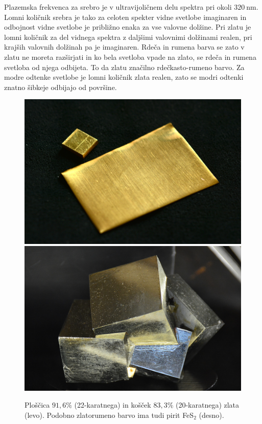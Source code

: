 Plazemska frekvenca za srebro je v ultravijoličnem delu spektra 
pri okoli $320~\si{\nano\meter}$. Lomni količnik srebra je tako za celoten 
spekter vidne svetlobe imaginaren in odbojnost
vidne svetlobe je približno enaka za vse valovne dolžine.  
Pri zlatu je lomni 
količnik za del vidnega spektra z daljšimi valovnimi dolžinami realen, pri 
krajših valovnih dolžinah pa je imaginaren. Rdeča in rumena barva se zato v zlatu 
ne moreta razširjati in ko bela svetloba vpade na zlato, se rdeča in rumena svetloba
od njega odbijeta. To da zlatu značilno rdečkasto-rumeno barvo. Za modre odtenke
svetlobe je lomni količnik zlata realen, zato se modri odtenki znatno šibkeje odbijajo od površine.
\begin{figure}[ht]
\centering
\includegraphics[width=7truecm]{slike/09_zlato.jpg}\hfill
\includegraphics[width=7truecm]{slike/09_pirit.jpg}
\caption{Ploščica $91,6\%$ (22-karatnega) in košček $83,3\%$ (20-karatnega) zlata (levo). 
Podobno zlatorumeno barvo ima tudi pirit FeS$_2$ (desno).}
\label{fig:09_zlato}
\end{figure}

